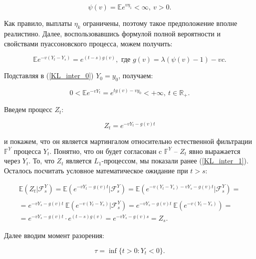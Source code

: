 \documentclass{article}
\theoremstyle{plain}
\theoremstyle{plain}
\theoremstyle{plain}
\theoremstyle{plain}
\theoremstyle{definition}
\theoremstyle{remark}
\begin{document}
\begin{equation}
    \psi(v) = \mathbb{E} e^{v \eta_1} < \infty,\ v > 0.
\end{equation}

Как правило, выплаты $\eta_k$ ограничены, поэтому такое предположение вполне реалистино. Далее, воспользовавшись формулой полной вероятности и свойствами пуассоновского процесса, можем получить:

\begin{equation}
\label{KL_inter_0}
    \mathbb{E} e^{-v(Y_t - Y_s)} = e^{(t - s)g(v)}, \text{ где } g(v) = \lambda(\psi(v) - 1) - vc.
\end{equation}

Подставляя в (\ref{KL_inter_0}) $Y_0 = y_0$, получаем:

\begin{equation}
\label{KL_inter_1}
    0 < \mathbb{E} e^{-v Y_t} = e^{t g(v) - v y_0} < + \infty,\ t \in \mathbb{R}_+.
\end{equation}


Введем процесс $Z_t$:

\begin{equation}
    Z_t = e^{-v Y_t - g(v) t}
\end{equation}

и покажем, что он является мартингалом относительно естественной фильтрации $\mathbb{F}^Y$ процесса $Y_t$. Понятно, что он будет согласован c $\mathbb{F}^Y$ -- $Z_t$ явно выражается через $Y_t$. То, что $Z_t$ является $L_1$-процессом, мы показали ранее (\ref{KL_inter_1}). Осталось посчитать условное математическое ожидание при $t > s$:

\begin{equation}
\begin{aligned}
    \mathbb{E} (Z_t | \mathcal{F}_s^Y) = \mathbb{E} (e^{-v Y_t - g(v) t} | \mathcal{F}_s^Y) = \mathbb{E} (e^{-v (Y_t - Y_s) - v Y_s - g(v) t} | \mathcal{F}_s^Y) = \\
    \\ = e^{- v Y_s - g(v) t}\ \mathbb{E} (e^{-v (Y_t - Y_s)} | \mathcal{F}_s^Y) = e^{- v Y_s - g(v) t}\ \mathbb{E} (e^{-v (Y_t - Y_s)}) = \\
    = e^{- v Y_s - g(v) t} \cdot e^{(t - s)g(v)} = e^{-v Y_s - g(v) s} = Z_s.
\end{aligned}
\end{equation}

Далее вводим момент разорения:

\begin{equation}
    \tau = \inf \{ t > 0 : Y_t < 0 \}.
\end{equation}
\end{document}
